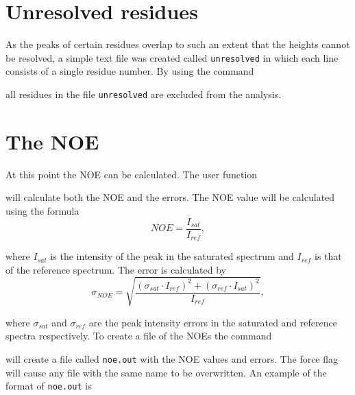 
\section{Unresolved residues}

As the peaks of certain residues overlap to such an extent that the heights cannot be resolved, a simple text file was created called \texttt{unresolved} in which each line consists of a single residue number.  By using the command


all residues in the file \texttt{unresolved} are excluded from the analysis.




\section{The NOE}

At this point the NOE can be calculated.  The user function


will calculate both the NOE and the errors.  The NOE value will be calculated using the formula
\begin{equation}
NOE = \frac{I_{sat}}{I_{ref}},
\end{equation}

\noindent where $I_{sat}$ is the intensity of the peak in the saturated spectrum and $I_{ref}$ is that of the reference spectrum.  The error is calculated by
\begin{equation}
\sigma_{NOE} = \sqrt{\frac{(\sigma_{sat} \cdot I_{ref})^2 + (\sigma_{ref} \cdot I_{sat})^2}{I_{ref}}},
\end{equation}

\noindent where $\sigma_{sat}$ and $\sigma_{ref}$ are the peak intensity errors in the saturated and reference spectra respectively.  To create a file of the NOEs the command


will create a file called \texttt{noe.out} with the NOE values and errors.  The force flag will cause any file with the same name to be overwritten.  An example of the format of \texttt{noe.out} is

